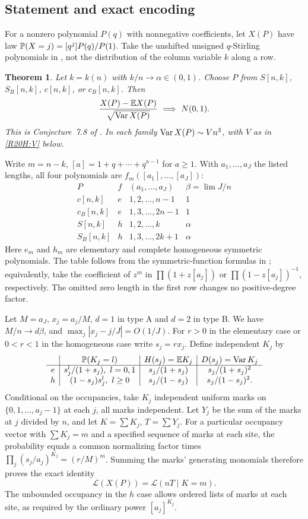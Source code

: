 \documentclass[11pt,a4paper]{article}
\newtheorem{SourceRcaHtheorem}{Theorem}
\begin{document}
\subsection{Statement and exact encoding}
For a nonzero polynomial $P(q)$ with nonnegative coefficients, let $X(P)$ have law $\mathbb{P}(X=j)=[q^j]P(q)/P(1)$. Take the unshifted unsigned $q$-Stirling polynomials in \cite{R20H:ss}, not the distribution of the column variable $k$ along a row.
\begin{SourceRcaHtheorem}\label{R20H:main}
Let $k=k(n)$ with $k/n\to\alpha\in(0,1)$. Choose $P$ from $S[n,k]$, $S_B[n,k]$, $c[n,k]$, or $c_B[n,k]$. Then
\[
 \frac{X(P)-\E X(P)}{\sqrt{\Var X(P)}}\ \Longrightarrow\ N(0,1).
\]
This is Conjecture~7.8 of \cite{R20H:ss}. In each family $\operatorname{Var} X(P)\sim V n^3$, with $V$ as in \eqref{R20H:V} below.
\end{SourceRcaHtheorem}
Write $m=n-k$, $[a]=1+q+\cdots+q^{a-1}$ for $a\ge1$. With $a_1,\ldots,a_J$ the listed lengths, all four polynomials are $f_m([a_1],\ldots,[a_J])$:
\[
\begin{array}{c|c|c|c}
 P & f & (a_1,\ldots,a_J)& \beta=\lim J/n\\ \hline
 c[n,k]   &e&1,2,\ldots,n-1 &1\\
 c_B[n,k] &e&1,3,\ldots,2n-1 &1\\
 S[n,k]   &h&1,2,\ldots,k &\alpha\\
 S_B[n,k] &h&1,3,\ldots,2k+1 &\alpha
\end{array}
\]
Here $e_m$ and $h_m$ are elementary and complete homogeneous symmetric polynomials. The table follows from the symmetric-function formulas in \cite{R20H:ss}; equivalently, take the coefficient of $z^m$ in $\prod(1+z[a_j])$ or $\prod(1-z[a_j])^{-1}$, respectively. The omitted zero length in the first row changes no positive-degree factor.

Let $M=a_J$, $x_j=a_j/M$, $d=1$ in type A and $d=2$ in type B. We have $M/n\to d\beta$, and $\max_j|x_j-j/J|=O(1/J)$. For $r>0$ in the elementary case or $0<r<1$ in the homogeneous case write $s_j=r x_j$. Define independent $K_j$ by
\[
\begin{array}{c|c|c|c}
 &\mathbb{P}(K_j=l)&H(s_j)=\mathbb{E} K_j&D(s_j)=\operatorname{Var} K_j \\ \hline
 e&s_j^l/(1+s_j),\ l=0,1 &s_j/(1+s_j)&s_j/(1+s_j)^2\\
 h&(1-s_j)s_j^l,\ l\ge0&s_j/(1-s_j)&s_j/(1-s_j)^2 .
\end{array}
\]
Conditional on the occupancies, take $K_j$ independent uniform marks on $\{0,1,\ldots,a_j-1\}$ at each $j$, all marks independent. Let $Y_j$ be the sum of the marks at $j$ divided by $n$, and let $K=\sum K_j$, $T=\sum Y_j$. For a particular occupancy vector with $\sum K_j=m$ and a specified sequence of marks at each site, the probability equals a common normalizing factor times
$\prod_j(s_j/a_j)^{K_j}=(r/M)^m$. Summing the marks' generating monomials therefore proves the exact identity
\begin{equation}\label{R20H:encode}
 \mathcal L(X(P))=\mathcal L(nT\mid K=m).
\end{equation}
The unbounded occupancy in the $h$ case allows ordered lists of marks at each site, as required by the ordinary power $[a_j]^{K_j}$.
\end{document}
